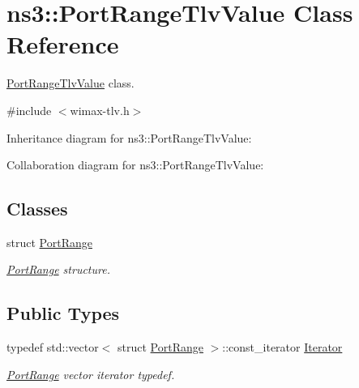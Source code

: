 \hypertarget{classns3_1_1PortRangeTlvValue}{}\section{ns3\+:\+:Port\+Range\+Tlv\+Value Class Reference}
\label{classns3_1_1PortRangeTlvValue}


\hyperlink{classns3_1_1PortRangeTlvValue}{Port\+Range\+Tlv\+Value} class.  




{\ttfamily \#include $<$wimax-\/tlv.\+h$>$}



Inheritance diagram for ns3\+:\+:Port\+Range\+Tlv\+Value\+:


Collaboration diagram for ns3\+:\+:Port\+Range\+Tlv\+Value\+:
\subsection*{Classes}
\begin{DoxyCompactItemize}
\item 
struct \hyperlink{structns3_1_1PortRangeTlvValue_1_1PortRange}{Port\+Range}
\begin{DoxyCompactList}\small\item\em \hyperlink{structns3_1_1PortRangeTlvValue_1_1PortRange}{Port\+Range} structure. \end{DoxyCompactList}\end{DoxyCompactItemize}
\subsection*{Public Types}
\begin{DoxyCompactItemize}
\item 
typedef std\+::vector$<$ struct \hyperlink{structns3_1_1PortRangeTlvValue_1_1PortRange}{Port\+Range} $>$\+::const\+\_\+iterator \hyperlink{classns3_1_1PortRangeTlvValue_a04bc61dc4b03a8e91d6ec855c8c88a69}{Iterator}
\begin{DoxyCompactList}\small\item\em \hyperlink{structns3_1_1PortRangeTlvValue_1_1PortRange}{Port\+Range} vector iterator typedef. \end{DoxyCompactList}\end{DoxyCompactItemize}
